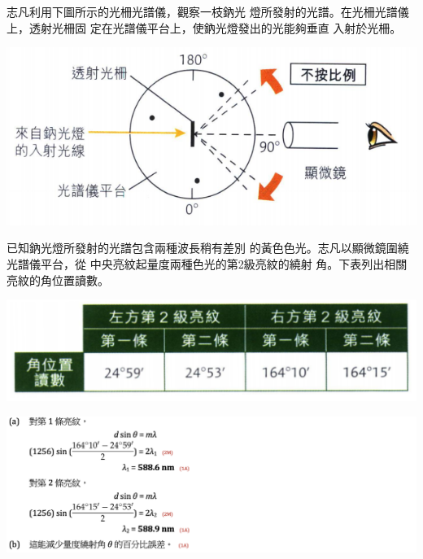 {
    志凡利用下圖所示的光柵光譜儀，觀察一枝鈉光 燈所發射的光譜。在光柵光譜儀上，透射光柵固 定在光譜儀平台上，使鈉光燈發出的光能夠垂直 入射於光柵。
    \par{\par\centering\includegraphics[width=.45\textwidth]{./img/ch4_earlyclass_wave_lq_2024-05-14-14-19-01.png}\par}
    已知鈉光燈所發射的光譜包含兩種波長稍有差別 的黃色色光。志凡以顯微鏡圍繞光譜儀平台，從 中央亮紋起量度兩種色光的第2級亮紋的繞射 角。下表列出相關亮紋的角位置讀數。
    \par{\par\centering\includegraphics[width=.6\textwidth]{./img/ch4_earlyclass_wave_lq_2024-05-14-14-22-31.png}\par}
}{
    \sol\par{\par\centering\includegraphics[width=\textwidth]{./img/ch4_earlyclass_wave_lq_2024-05-14-14-24-55.png}\par}
}

